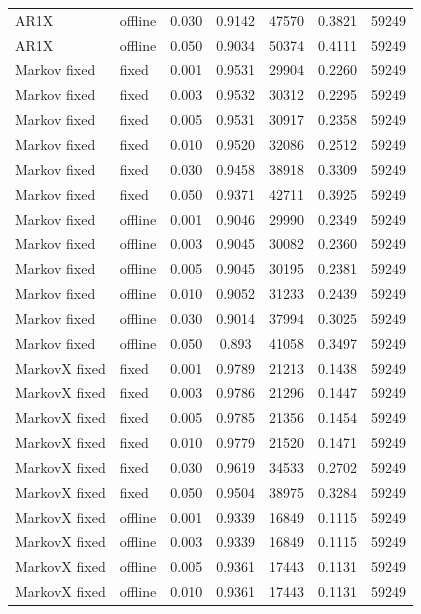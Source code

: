 \documentclass{article}
\begin{document}
\begin{longtable}[htbp]{l|l|l|*{4}{c}}
    AR1X & offline & 0.030 & 0.9142 & 47570 & 0.3821 & 59249\\
    AR1X & offline & 0.050 & 0.9034 & 50374 & 0.4111 & 59249\\
    Markov fixed & fixed & 0.001 & 0.9531 & 29904 & 0.2260 & 59249\\
    Markov fixed & fixed & 0.003 & 0.9532 & 30312 & 0.2295 & 59249\\
    Markov fixed & fixed & 0.005 & 0.9531 & 30917 & 0.2358 & 59249\\
    Markov fixed & fixed & 0.010 & 0.9520 & 32086 & 0.2512 & 59249\\
    Markov fixed & fixed & 0.030 & 0.9458 & 38918 & 0.3309 & 59249\\
    Markov fixed & fixed & 0.050 & 0.9371 & 42711 & 0.3925 & 59249\\
    Markov fixed & offline & 0.001 & 0.9046 & 29990 & 0.2349 & 59249\\
    Markov fixed & offline & 0.003 & 0.9045 & 30082 & 0.2360 & 59249\\
    Markov fixed & offline & 0.005 & 0.9045 & 30195 & 0.2381 & 59249\\
    Markov fixed & offline & 0.010 & 0.9052 & 31233 & 0.2439 & 59249\\
    Markov fixed & offline & 0.030 & 0.9014 & 37994 & 0.3025 & 59249\\
    Markov fixed & offline & 0.050 & 0.893 & 41058 & 0.3497 & 59249\\
    MarkovX fixed & fixed & 0.001 & 0.9789 & 21213 & 0.1438 & 59249\\
    MarkovX fixed & fixed & 0.003 & 0.9786 & 21296 & 0.1447 & 59249\\
    MarkovX fixed & fixed & 0.005 & 0.9785 & 21356 & 0.1454 & 59249\\
    MarkovX fixed & fixed & 0.010 & 0.9779 & 21520 & 0.1471 & 59249\\
    MarkovX fixed & fixed & 0.030 & 0.9619 & 34533 & 0.2702 & 59249\\
    MarkovX fixed & fixed & 0.050 & 0.9504 & 38975 & 0.3284 & 59249\\
    MarkovX fixed & offline & 0.001 & 0.9339 & 16849 & 0.1115 & 59249\\
    MarkovX fixed & offline & 0.003 & 0.9339 & 16849 & 0.1115 & 59249\\
    MarkovX fixed & offline & 0.005 & 0.9361 & 17443 & 0.1131 & 59249\\
    MarkovX fixed & offline & 0.010 & 0.9361 & 17443 & 0.1131 & 59249\\

\end{longtable}
\end{document}
